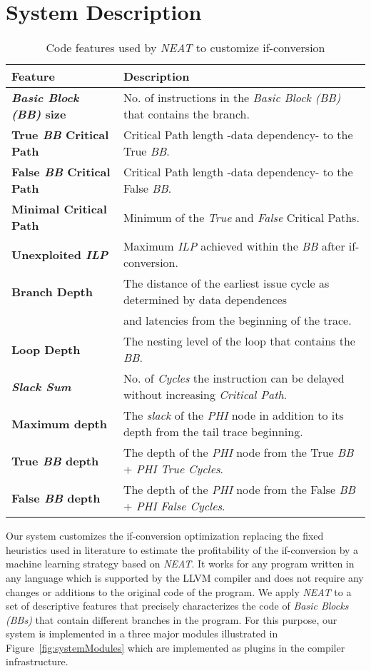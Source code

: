 \documentclass[preprint,nocopyrightspace]{sigplanconf}
\begin{document}
\section{System Description}
\label{system}
\begin{table*}[!ht]
\centering
\begin{tabular}{@{}l l@{}}
\toprule
Feature&Description\\
\midrule
\textbf{\textit{Basic Block (BB)} size}&No. of instructions in the \textit{Basic Block (BB)} that contains the branch.\\
\textbf{True \textit{BB} Critical Path}& Critical Path length -data dependency- to the True \textit{BB}.\\
\textbf{False \textit{BB} Critical Path}& Critical Path length -data dependency- to the False \textit{BB}.\\
\textbf{Minimal Critical Path}&Minimum of the \textit{True} and \textit{False} Critical Paths.\\
\textbf{Unexploited \textit{ILP}}&Maximum \textit{ILP} achieved within the \textit{BB} after if-conversion.\\
\textbf{Branch Depth}&The distance of the earliest issue cycle as determined by data dependences \\
 &and latencies from the beginning of the trace.\\
\textbf{Loop Depth}&The nesting level of the loop that contains the \textit{BB}.\\
\textbf{\textit{Slack Sum}}&No. of \textit{Cycles} the instruction can be delayed without increasing \textit{Critical Path}.\\
\textbf{Maximum depth}&The \textit{slack} of the \textit{PHI} node in addition to its depth from the tail trace beginning.\\
\textbf{True \textit{BB} depth}&The depth of the \textit{PHI} node from the True \textit{BB} + \textit{PHI True Cycles}.\\
\textbf{False \textit{BB} depth}&The depth of the \textit{PHI} node from the False \textit{BB} + \textit{PHI False Cycles}.\\
\bottomrule
\end{tabular}
\caption{Code features used by \textit{NEAT} to customize if-conversion}
\label{tab:features}
\end{table*}
Our system customizes the if-conversion optimization replacing the fixed heuristics used in literature to estimate the profitability of the if-conversion by a machine learning strategy based on \textit{NEAT}. It works for any program written in any language which is supported by the LLVM compiler and does not require any changes or additions to the original code of the program.
We apply \textit{NEAT} to a set of descriptive features that precisely characterizes the code of \textit{Basic Blocks (BBs)} that contain different branches in the program. For this purpose, our system is implemented in a three major modules illustrated in Figure~\ref{fig:systemModules} which are implemented as plugins in the compiler infrastructure. 
\end{document}
